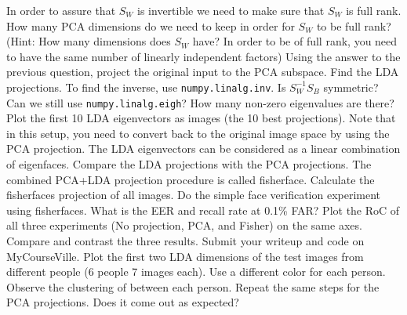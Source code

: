 \documentclass{article}
\newcounter{question}
\newcounter{oquestion}
\begin{document}
\question In order to assure that $S_W$ is invertible we need to make sure that $S_W$ is full rank. How many PCA dimensions do we need to keep in order for $S_W$ to be full rank? (Hint: How many dimensions does $S_W$ have? In order to be of full rank, you need to have the same number of linearly independent factors)
\question Using the answer to the previous question, project the original input to the PCA subspace. Find the LDA projections. To find the inverse, use \texttt{numpy.linalg.inv}. Is $S_W^{-1}S_B$ symmetric? Can we still use \texttt{numpy.linalg.eigh}? How many non-zero eigenvalues are there?
\question Plot the first 10 LDA eigenvectors as images (the 10 best projections). Note that in this setup, you need to convert back to the original image space by using the PCA projection. The LDA eigenvectors can be considered as a linear combination of eigenfaces. Compare the LDA projections with the PCA projections. 
\question The combined PCA+LDA projection procedure is called fisherface. Calculate the fisherfaces projection of all images. Do the simple face verification experiment using fisherfaces. What is the EER and recall rate at 0.1\% FAR?
\question Plot the RoC of all three experiments (No projection, PCA, and Fisher) on the same axes. Compare and contrast the three results. Submit your writeup and code on MyCourseVille.
\oquestion Plot the first two LDA dimensions of the test images from different people (6 people 7 images each). Use a different color for each person. Observe the clustering of between each person. Repeat the same steps for the PCA projections. Does it come out as expected?
\end{document}
